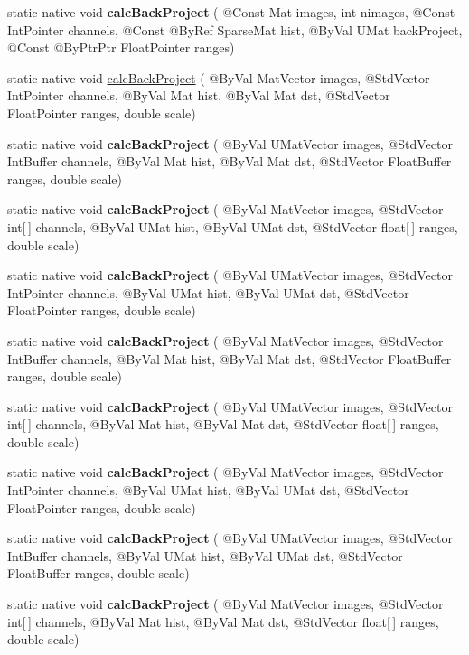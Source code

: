 \begin{DoxyCompactItemize}
\item 
static native void {\bfseries calc\+Back\+Project} ( @Const Mat images, int nimages, @Const Int\+Pointer channels, @Const @By\+Ref Sparse\+Mat hist, @By\+Val U\+Mat back\+Project, @Const @By\+Ptr\+Ptr Float\+Pointer ranges)
\item 
static native void \hyperlink{group__imgproc__hist_ga08b1470561cb4171cc528b2bdba50764}{calc\+Back\+Project} ( @By\+Val Mat\+Vector images, @Std\+Vector Int\+Pointer channels, @By\+Val Mat hist, @By\+Val Mat dst, @Std\+Vector Float\+Pointer ranges, double scale)
\item 
static native void {\bfseries calc\+Back\+Project} ( @By\+Val U\+Mat\+Vector images, @Std\+Vector Int\+Buffer channels, @By\+Val Mat hist, @By\+Val Mat dst, @Std\+Vector Float\+Buffer ranges, double scale)
\item 
static native void {\bfseries calc\+Back\+Project} ( @By\+Val Mat\+Vector images, @Std\+Vector int\mbox{[}$\,$\mbox{]} channels, @By\+Val U\+Mat hist, @By\+Val U\+Mat dst, @Std\+Vector float\mbox{[}$\,$\mbox{]} ranges, double scale)
\item 
static native void {\bfseries calc\+Back\+Project} ( @By\+Val U\+Mat\+Vector images, @Std\+Vector Int\+Pointer channels, @By\+Val U\+Mat hist, @By\+Val U\+Mat dst, @Std\+Vector Float\+Pointer ranges, double scale)
\item 
static native void {\bfseries calc\+Back\+Project} ( @By\+Val Mat\+Vector images, @Std\+Vector Int\+Buffer channels, @By\+Val Mat hist, @By\+Val Mat dst, @Std\+Vector Float\+Buffer ranges, double scale)
\item 
static native void {\bfseries calc\+Back\+Project} ( @By\+Val U\+Mat\+Vector images, @Std\+Vector int\mbox{[}$\,$\mbox{]} channels, @By\+Val Mat hist, @By\+Val Mat dst, @Std\+Vector float\mbox{[}$\,$\mbox{]} ranges, double scale)
\item 
static native void {\bfseries calc\+Back\+Project} ( @By\+Val Mat\+Vector images, @Std\+Vector Int\+Pointer channels, @By\+Val U\+Mat hist, @By\+Val U\+Mat dst, @Std\+Vector Float\+Pointer ranges, double scale)
\item 
static native void {\bfseries calc\+Back\+Project} ( @By\+Val U\+Mat\+Vector images, @Std\+Vector Int\+Buffer channels, @By\+Val U\+Mat hist, @By\+Val U\+Mat dst, @Std\+Vector Float\+Buffer ranges, double scale)
\item 
static native void {\bfseries calc\+Back\+Project} ( @By\+Val Mat\+Vector images, @Std\+Vector int\mbox{[}$\,$\mbox{]} channels, @By\+Val Mat hist, @By\+Val Mat dst, @Std\+Vector float\mbox{[}$\,$\mbox{]} ranges, double scale)

\end{DoxyCompactItemize}
